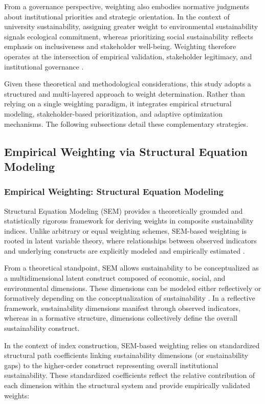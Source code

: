 \documentclass[11pt,a4paper]{article}
\begin{document}
From a governance perspective, weighting also embodies normative judgments about institutional priorities and strategic orientation. In the context of university sustainability, assigning greater weight to environmental sustainability signals ecological commitment, whereas prioritizing social sustainability reflects emphasis on inclusiveness and stakeholder well-being. Weighting therefore operates at the intersection of empirical validation, stakeholder legitimacy, and institutional governance \cite{Cinelli2014}.

Given these theoretical and methodological considerations, this study adopts a structured and multi-layered approach to weight determination. Rather than relying on a single weighting paradigm, it integrates empirical structural modeling, stakeholder-based prioritization, and adaptive optimization mechanisms. The following subsections detail these complementary strategies.
\subsection{Empirical Weighting via Structural Equation Modeling}
\subsubsection{Empirical Weighting: Structural Equation Modeling}

Structural Equation Modeling (SEM) provides a theoretically grounded and statistically rigorous framework for deriving weights in composite sustainability indices. Unlike arbitrary or equal weighting schemes, SEM-based weighting is rooted in latent variable theory, where relationships between observed indicators and underlying constructs are explicitly modeled and empirically estimated \cite{Bollen1989,Kline2016}.

From a theoretical standpoint, SEM allows sustainability to be conceptualized as a multidimensional latent construct composed of economic, social, and environmental dimensions. These dimensions can be modeled either reflectively or formatively depending on the conceptualization of sustainability \cite{Diamantopoulos2006,Jarvis2003}. In a reflective framework, sustainability dimensions manifest through observed indicators, whereas in a formative structure, dimensions collectively define the overall sustainability construct.

In the context of index construction, SEM-based weighting relies on standardized structural path coefficients linking sustainability dimensions (or sustainability gaps) to the higher-order construct representing overall institutional sustainability. These standardized coefficients reflect the relative contribution of each dimension within the structural system and provide empirically validated weights:
\end{document}
